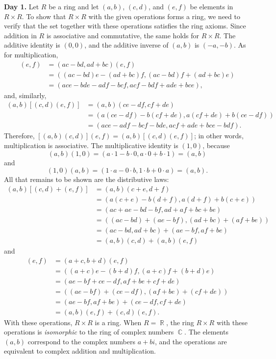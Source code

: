 \documentclass{article}
\DeclareMathOperator{\R}{\mathbb{R}}
\DeclareMathOperator{\C}{\mathbb{C}}
\begin{document}
\textbf{Day 1.} Let \(R\) be a ring and let \((a,b)\), \((c,d)\), and \((e,f)\) be elements in \(R\times R\). To show that \(R\times R\) with the given operations forms a ring, we need to verify that the set together with these operations satisfies the ring axioms. Since addition in \(R\) is associative and commutative, the same holds for \(R\times R\). The additive identity is \((0,0)\), and the additive inverse of \((a,b)\) is \((-a,-b)\). As for multiplication,
\begin{align*}
    [(a,b)(c,d)](e,f) &= (ac-bd, ad+bc)(e,f) \\
    &= ((ac-bd)e-(ad+bc)f, (ac-bd)f+(ad+bc)e) \\
    &= (ace-bde-adf-bcf, acf-bdf+ade+bce),
\end{align*}
and, similarly,
\begin{align*}
    (a,b)[(c,d)(e,f)] &= (a,b)(ce-df,cf+de) \\
    &= (a(ce-df)-b(cf+de), a(cf+de)+b(ce-df)) \\
    &= (ace-adf-bcf-bde, acf+ade+bce-bdf).
\end{align*}
Therefore, \([(a,b)(c,d)](e,f)=(a,b)[(c,d)(e,f)]\); in other words, multiplication is associative. The multiplicative identity is \((1,0)\), because
\[(a,b)(1,0)=(a\cdot1-b\cdot0, a\cdot0+b\cdot1)=(a,b)\]
and
\[(1,0)(a,b)=(1\cdot a-0\cdot b, 1\cdot b+0\cdot a)=(a,b).\]
All that remains to be shown are the distributive laws:
\begin{align*}
    (a,b)[(c,d)+(e,f)] &= (a,b)(c+e,d+f) \\
    &= (a(c+e)-b(d+f),a(d+f)+b(c+e)) \\
    &= (ac+ae-bd-bf, ad+af+bc+be) \\
    &= ((ac-bd)+(ae-bf), (ad+bc)+(af+be)) \\
    &= (ac-bd,ad+bc)+(ae-bf,af+be) \\
    &= (a,b)(c,d)+(a,b)(e,f)
\end{align*}
and
\begin{align*}
    [(a,b)+(c,d)](e,f) &= (a+c,b+d)(e,f) \\
    &= ((a+c)e-(b+d)f, (a+c)f+(b+d)e) \\
    &= (ae-bf+ce-df, af+be+cf+de) \\
    &= ((ae-bf)+(ce-df), (af+be)+(cf+de)) \\
    &= (ae-bf, af+be) + (ce-df, cf+de) \\
    &= (a,b)(e,f) + (c,d)(e,f).
\end{align*}
With these operations, \(R\times R\) is a ring. When \(R=\R\), the ring \(R\times R\) with these operations is \textit{isomorphic} to the ring of complex numbers \(\C\). The 
elements \((a,b)\) correspond to the complex numbers \(a+bi\), and the operations are equivalent to complex addition and multiplication. 
\end{document}
